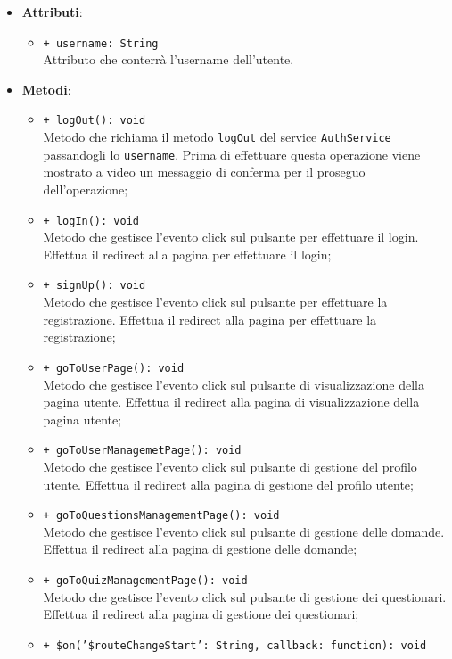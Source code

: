 \begin{itemize}
	\item \textbf{Attributi}: 
	\begin{itemize}
		\item \texttt{+ username: String} \\ Attributo che conterrà l'username dell'utente.
	\end{itemize}
	\item \textbf{Metodi}: 
	\begin{itemize}
		\item \texttt{+ logOut(): void} \\
		Metodo che richiama il metodo \texttt{logOut} del service \texttt{AuthService} passandogli lo \texttt{username}. Prima di effettuare questa operazione viene mostrato a video un messaggio di conferma per il proseguo dell'operazione; 
		\item \texttt{+ logIn(): void} \\
		Metodo che gestisce l’evento click sul pulsante per effettuare il login. Effettua il redirect alla pagina per effettuare il login; 
		\item \texttt{+ signUp(): void} \\
		Metodo che gestisce l’evento click sul pulsante per effettuare la registrazione. Effettua il redirect alla pagina per effettuare la registrazione; 
		\item \texttt{+ goToUserPage(): void} \\
		Metodo che gestisce l’evento click sul pulsante di visualizzazione della pagina utente. Effettua il redirect alla pagina di visualizzazione della pagina utente; 
		\item \texttt{+ goToUserManagemetPage(): void} \\
		Metodo che gestisce l’evento click sul pulsante di gestione del profilo utente. Effettua il redirect alla pagina di gestione del profilo utente; 
		\item \texttt{+ goToQuestionsManagementPage(): void} \\
		Metodo che gestisce l’evento click sul pulsante di gestione delle domande. Effettua il redirect alla pagina di gestione delle domande; 
		\item \texttt{+ goToQuizManagementPage(): void} \\
		Metodo che gestisce l’evento click sul pulsante di gestione dei questionari. Effettua il redirect alla pagina di gestione dei questionari;
		\item \texttt{+ \$on('\$routeChangeStart': String, callback: function): void} \\

\end{itemize}
\end{itemize}
